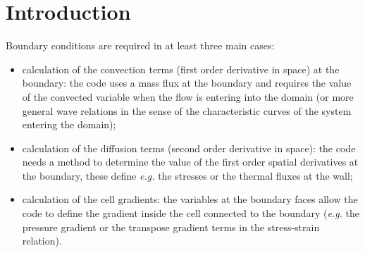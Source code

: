 
%
%
%
%

\section{Introduction}

\hypertarget{boundary}{}

Boundary conditions are required in at least three main cases:

\begin{itemize}
\item calculation of the convection terms (first order derivative in space) at
the boundary: the code uses a mass flux at the boundary and requires the
value of the convected variable when the flow is entering into
the domain (or more general wave relations in the sense of the characteristic curves of the system entering the domain);
\item calculation of the diffusion terms (second order derivative
in space): the code needs
a method to determine the value of the first order spatial derivatives
at the boundary, these define \emph{e.g.} the stresses or the thermal fluxes at the wall;
\item calculation of the cell  gradients: the variables at the boundary faces
 allow the code to define the gradient inside the cell connected to the boundary (\emph{e.g.} the pressure gradient or
the transpose gradient terms in the stress-strain relation).
\end{itemize}

